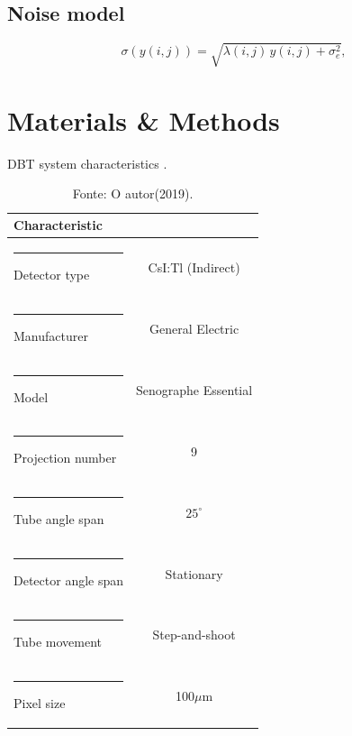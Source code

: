 \documentclass[10pt,twoside,twocolumn]{article}
\begin{document}
\lipsum

\subsection{Noise model}


\lipsum

\begin{equation}
\label{eq.Eq2}
 \sigma(y(i,j)) = \sqrt{\lambda(i,j) \, y(i,j) + \sigma^{2}_{e}},
\end{equation}


\section{Materials \& Methods}

\lipsum


\begin{table}[ht]
\caption{DBT system characteristics \cite{vedantham2015digital}.}
	\label{tab:tab1}
   	\centering
	\begin{tabular}{l|c}
		\textbf{Characteristic}                                       &        \textbf{}              \\
		[1pt]
		\hline
        \rule[-0.5ex]{-3pt}{1ex}
		Detector type                 &         CsI:Tl (Indirect)                               \\ \hline
       	\rule[-0.5ex]{-3pt}{1ex}
		Manufacturer &    General Electric    \\ \hline
		\rule[-0.5ex]{-3pt}{1ex}
		Model &    Senographe Essential    \\ \hline
		\rule[-0.5ex]{-3pt}{1ex}
		Projection number              &                9                                               \\ \hline
		\rule[-0.5ex]{-3pt}{1ex}
		Tube angle span                &           $25^{\circ}$          		                          \\ \hline
		\rule[-0.5ex]{-3pt}{1ex}
		Detector angle span           &          Stationary                                  \\ \hline
		\rule[-0.5ex]{-3pt}{1ex}
		Tube movement                &     Step-and-shoot                              \\ \hline
		\rule[-0.5ex]{-3pt}{1ex}
		Pixel size        &            100$\mu$m                                \\ \hline
	\end{tabular}
	\caption*{Fonte: O autor(2019).}
\end{table}
\end{document}
